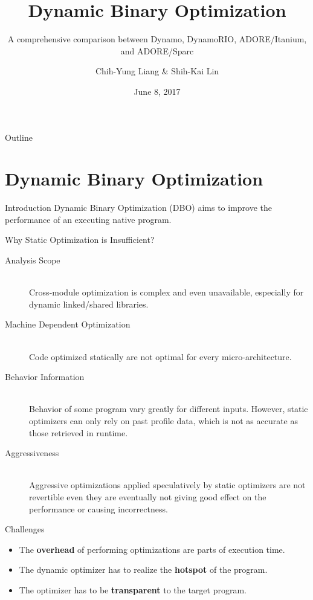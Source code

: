 \documentclass[aspectratio=169,xcolor=x11names]{beamer}
\title{Dynamic Binary Optimization}
\subtitle{A comprehensive comparison between Dynamo, DynamoRIO, ADORE/Itanium, and ADORE/Sparc}
\date{June 8, 2017}
\author{Chih-Yung Liang \& Shih-Kai Lin}
\institute[NTU CSIE]{Department of Computer Science and Information Engineering,\\National Taiwan University}
\begin{document}
	\maketitle
	
	\begin{frame}{Outline}
		\tableofcontents[
			hidesubsections,
		]
	\end{frame}
	
	\section{Dynamic Binary Optimization}
	\begin{frame}{Introduction}
	Dynamic Binary Optimization (DBO) aims to improve the \alert{performance} of an executing native program.
	\end{frame}

	\begin{frame}{Why Static Optimization is Insufficient?}
		\begin{description}
			\item[Analysis Scope] \hfill \\
				Cross-module optimization is complex and even unavailable, especially for dynamic linked/shared libraries.
			\item[Machine Dependent Optimization] \hfill \\
				Code optimized statically are not optimal for every micro-architecture.
			\item[Behavior Information] \hfill \\
				Behavior of some program vary greatly for different inputs. However, static optimizers can only rely on past profile data, which is not as accurate as those retrieved in runtime.
			\item[Aggressiveness] \hfill \\
				Aggressive optimizations applied speculatively by static optimizers are not revertible even they are eventually not giving good effect on the performance or causing incorrectness.
		\end{description}
	\end{frame}

	\begin{frame}{Challenges}
		\begin{itemize}
			\item The \textbf{overhead} of performing optimizations are parts of execution time.
			\item The dynamic optimizer has to realize the \textbf{hotspot} of the program.
			\item The optimizer has to be \textbf{transparent} to the target program.
		\end{itemize}
	\end{frame}
\end{document}
